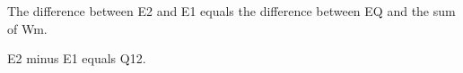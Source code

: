 The difference between E2 and E1 equals the difference between EQ and the sum of Wm.

E2 minus E1 equals Q12.